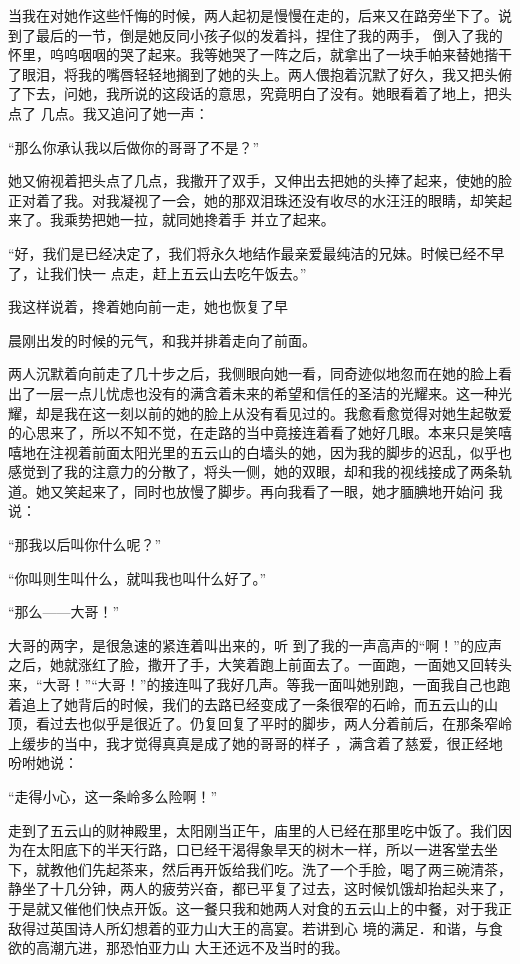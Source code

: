 \documentclass{article}
\begin{document}
当我在对她作这些忏悔的时候，两人起初是慢慢在走的，后来又在路旁坐下了。说到了最后的一节，倒是她反同小孩子似的发着抖，捏住了我的两手，
\newpage
倒入了我的怀里，呜呜咽咽的哭了起来。我等她哭了一阵之后，就拿出了一块手帕来替她揩干了眼泪，将我的嘴唇轻轻地搁到了她的头上。两人偎抱着沉默了好久，我又把头俯了下去，问她，我所说的这段话的意思，究竟明白了没有。她眼看着了地上，把头点了
几点。我又追问了她一声： 


“那么你承认我以后做你的哥哥了不是？” 

她又俯视着把头点了几点，我撒开了双手，又伸出去把她的头捧了起来，使她的脸正对着了我。对我凝视了一会，她的那双泪珠还没有收尽的水汪汪的眼睛，却笑起来了。我乘势把她一拉，就同她搀着手
并立了起来。 

“好，我们是已经决定了，我们将永久地结作最亲爱最纯洁的兄妹。时候已经不早了，让我们快一
点走，赶上五云山去吃午饭去。” 

我这样说着，搀着她向前一走，她也恢复了早

\newpage
晨刚出发的时候的元气，和我并排着走向了前面。 

两人沉默着向前走了几十步之后，我侧眼向她一看，同奇迹似地忽而在她的脸上看出了一层一点儿忧虑也没有的满含着未来的希望和信任的圣洁的光耀来。这一种光耀，却是我在这一刻以前的她的脸上从没有看见过的。我愈看愈觉得对她生起敬爱的心思来了，所以不知不觉，在走路的当中竟接连着看了她好几眼。本来只是笑嘻嘻地在注视着前面太阳光里的五云山的白墙头的她，因为我的脚步的迟乱，似乎也感觉到了我的注意力的分散了，将头一侧，她的双眼，却和我的视线接成了两条轨道。她又笑起来了，同时也放慢了脚步。再向我看了一眼，她才腼腆地开始问
我说： 


“那我以后叫你什么呢？” 

“你叫则生叫什么，就叫我也叫什么好了。”


“那么——大哥！” 

大哥的两字，是很急速的紧连着叫出来的，听
\newpage
到了我的一声高声的“啊！”的应声之后，她就涨红了脸，撒开了手，大笑着跑上前面去了。一面跑，一面她又回转头来，“大哥！”“大哥！”的接连叫了我好几声。等我一面叫她别跑，一面我自己也跑着追上了她背后的时候，我们的去路已经变成了一条很窄的石岭，而五云山的山顶，看过去也似乎是很近了。仍复回复了平时的脚步，两人分着前后，在那条窄岭上缓步的当中，我才觉得真真是成了她的哥哥的样子
，满含着了慈爱，很正经地吩咐她说： 


“走得小心，这一条岭多么险啊！” 

走到了五云山的财神殿里，太阳刚当正午，庙里的人已经在那里吃中饭了。我们因为在太阳底下的半天行路，口已经干渴得象旱天的树木一样，所以一进客堂去坐下，就教他们先起茶来，然后再开饭给我们吃。洗了一个手脸，喝了两三碗清茶，静坐了十几分钟，两人的疲劳兴奋，都已平复了过去，这时候饥饿却抬起头来了，于是就又催他们快点开饭。这一餐只我和她两人对食的五云山上的中餐，对于我正敌得过英国诗人所幻想着的亚力山大王的高宴。若讲到心
\newpage
境的满足．和谐，与食欲的高潮亢进，那恐怕亚力山
大王还远不及当时的我。 
\end{document}
